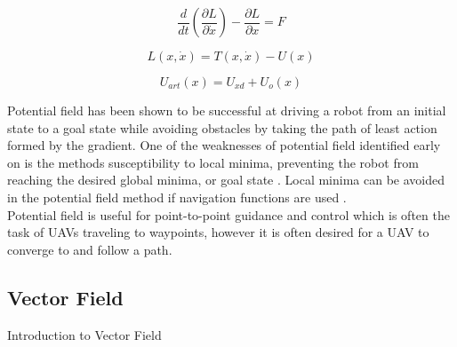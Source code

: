 \documentclass[numbered,pdftex]{ohio-etd}
\begin{document}
\begin{equation}\label{LeeMotion}
\frac{d}{dt} \left(\frac{\partial L}{\partial \dot{x}}\right) - \frac{\partial L}{\partial x} = F
\end{equation}

\begin{equation}\label{lagrange}
L(x,\dot{x}) = T(x,\dot{x}) - U(x)
\end{equation}

\begin{equation}\label{potential}
U_{art}(x) = U_{xd} + U_o(x)
\end{equation}

Potential field has been shown to be successful at driving a robot from an initial state to a goal state while avoiding obstacles by taking the path of least action formed by the gradient. One of the weaknesses of potential field identified early on is the methods susceptibility to local minima, preventing the robot from reaching the desired global minima, or goal state \cite{koren_potential_1991}. Local minima can be avoided in the potential field method if navigation functions are used \cite{goerzen_survey_2010}.\\

Potential field is useful for point-to-point guidance and control which is often the task of UAVs traveling to waypoints, however it is often desired for a UAV to converge to and follow a path. 

%
%
%


\subsection{Vector Field}
{Introduction to Vector Field}
\end{document}
